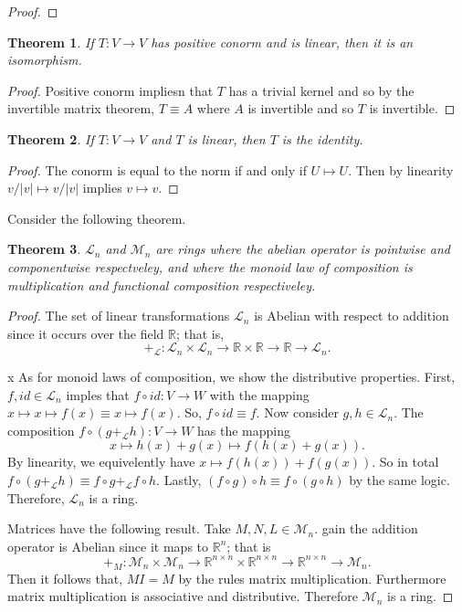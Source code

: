 \documentclass[letter]{article}
\newtheorem{theorem}{Theorem}
\newenvironment{menumerate}{%
  \edef\backupindent{\the\parindent}%
  \enumerate%
  \setlength{\parindent}{\backupindent}%
}{\endenumerate}
\begin{document}
\begin{menumerate}
\begin{proof}
	\end{proof}

	\begin{theorem}
		If $T: V \to V$ has positive conorm and is linear, then it is an isomorphism.
	\end{theorem}
	\begin{proof}
		Positive conorm impliesn that $T$ has a trivial kernel and so by the invertible matrix theorem,
		$T \equiv A$ where $A$ is invertible and so $T$ is invertible.
	\end{proof}

	\begin{theorem}
	If $T:V \to V$ and $T$ is linear, then $T$ is the identity.
	\end{theorem}
	\begin{proof}
		The conorm is equal to the norm if and only if $U \mapsto U.$ Then by linearity $v/|v| \mapsto v/|v|$ implies 
		$v \mapsto v.$
	\end{proof}

	\setcounter{enumi}{5}
	\item %
	Consider the following theorem.
	\begin{theorem}
		$\mathcal{L}_n$ and $\mathcal{M}_n$ are rings where the abelian operator is
		pointwise and componentwise respectveley, and where the monoid
		law of composition is multiplication and functional composition 
		respectiveley.
	\end{theorem}
	\begin{proof}
		The set of linear transformations $\mathcal{L}_n$  is Abelian with respect to
		addition since it occurs over the field $\mathbb{R}$; that is,
		 $$+_\mathcal{L} : \mathcal{L}_n\times \mathcal{L}_n \to \mathbb{R} \times \mathbb{R} \to \mathbb{R} \to \mathcal{L}_n.$$

x	
		As for monoid laws of composition, we show the distributive properties. First,
		$f, id \in \mathcal{L}_n$ imples that $f \circ id : V \to W$ with the mapping
		$x \mapsto x \mapsto f(x) \equiv x \mapsto f(x)$. So, $f \circ id \equiv f.$
		Now consider $g,h \in \mathcal{L}_n.$ The composition $f \circ (g +_\mathcal{L} h): V \to W$
		has the mapping
		$$x \mapsto h(x) + g(x) \mapsto f(h(x) + g(x)).$$
		By linearity, we equivelently have $x \mapsto f(h(x)) + f(g(x)).$ So in total
		$f \circ(g +_\mathcal{L} h) \equiv f \circ g +_\mathcal{L} f \circ h.$ Lastly,
		$(f \circ  g) \circ h \equiv f \circ (g \circ h)$ by the same logic. Therefore, $\mathcal{L}_n$ is a ring.
		
		Matrices have the following result. Take $M,N,L \in \mathcal{M}_n$.
		gain the addition operator is Abelian since it maps to $\mathbb{R}^n$; that is
		$$+_M: \mathcal{M}_n \times \mathcal{M}_n \to \mathbb{R}^{n\times n} \times \mathbb{R}^{n\times n} \to \mathbb{R}^{n\times n} \to \mathcal{M}_n.$$ 
		Then it follows that, $MI = M$ by the rules matrix multiplication. 
		Furthermore matrix multiplication is associative and distributive. Therefore 
		$\mathcal{M}_n$ is a ring.


\end{proof}
\end{menumerate}
\end{document}
